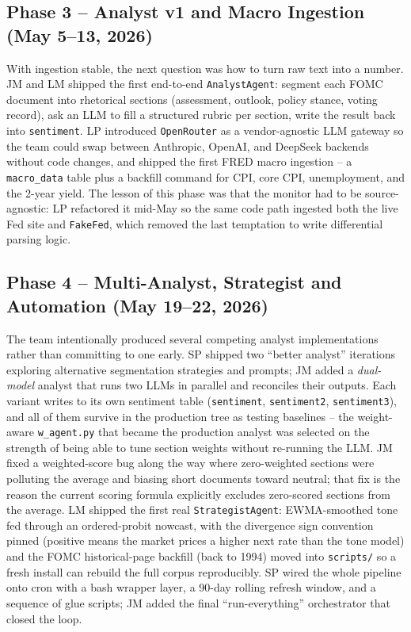\subsection{Phase 3 -- Analyst v1 and Macro Ingestion (May 5--13, 2026)}
With ingestion stable, the next question was how to turn raw text into a number. JM and LM shipped the first end-to-end \texttt{AnalystAgent}: segment each FOMC document into rhetorical sections (assessment, outlook, policy stance, voting record), ask an LLM to fill a structured rubric per section, write the result back into \texttt{sentiment}. LP introduced \texttt{OpenRouter} as a vendor-agnostic LLM gateway so the team could swap between Anthropic, OpenAI, and DeepSeek backends without code changes, and shipped the first FRED macro ingestion -- a \texttt{macro\_data} table plus a backfill command for CPI, core CPI, unemployment, and the 2-year yield. The lesson of this phase was that the monitor had to be source-agnostic: LP refactored it mid-May so the same code path ingested both the live Fed site and \texttt{FakeFed}, which removed the last temptation to write differential parsing logic.

\subsection{Phase 4 -- Multi-Analyst, Strategist and Automation (May 19--22, 2026)}
The team intentionally produced several competing analyst implementations rather than committing to one early. SP shipped two ``better analyst'' iterations exploring alternative segmentation strategies and prompts; JM added a \emph{dual-model} analyst that runs two LLMs in parallel and reconciles their outputs. Each variant writes to its own sentiment table (\texttt{sentiment}, \texttt{sentiment2}, \texttt{sentiment3}), and all of them survive in the production tree as testing baselines -- the weight-aware \texttt{w\_agent.py} that became the production analyst was selected on the strength of being able to tune section weights without re-running the LLM. JM fixed a weighted-score bug along the way where zero-weighted sections were polluting the average and biasing short documents toward neutral; that fix is the reason the current scoring formula explicitly excludes zero-scored sections from the average. LM shipped the first real \texttt{StrategistAgent}: EWMA-smoothed tone fed through an ordered-probit nowcast, with the divergence sign convention pinned (positive means the market prices a higher next rate than the tone model) and the FOMC historical-page backfill (back to 1994) moved into \texttt{scripts/} so a fresh install can rebuild the full corpus reproducibly. SP wired the whole pipeline onto cron with a bash wrapper layer, a 90-day rolling refresh window, and a sequence of glue scripts; JM added the final ``run-everything'' orchestrator that closed the loop.

